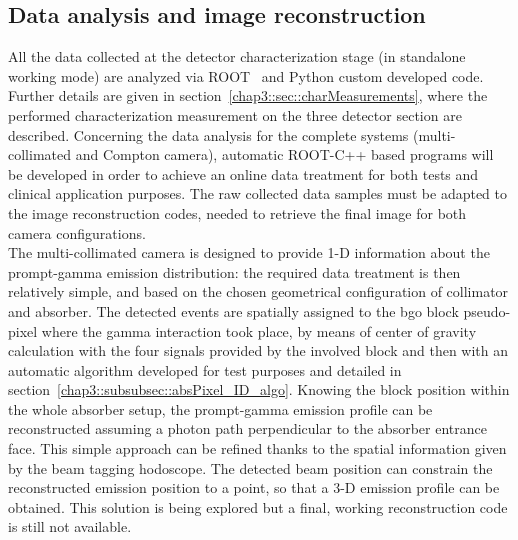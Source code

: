 
\subsection{Data analysis and image reconstruction}\label{chap3::subsec::dataAnalysis}

All the data collected at the detector characterization stage (in standalone working mode) are analyzed via ROOT~\parencite{Brun1997} and Python custom developed code. Further details are given in section~\ref{chap3::sec::charMeasurements}, where the performed characterization measurement on the three detector section are described. Concerning the data analysis for the complete systems (multi-collimated and Compton camera), automatic ROOT-C++ based programs will be developed in order to achieve an online data treatment for both tests and clinical application purposes. The raw collected data samples must be adapted to the image reconstruction codes, needed to retrieve the final image for both camera configurations.\\
The multi-collimated camera is designed to provide 1-D information about the prompt-gamma emission distribution: the required data treatment is then relatively simple, and based on the chosen geometrical configuration of collimator and absorber. The detected events are spatially assigned to the \gls{bgo} block pseudo-pixel where the gamma interaction took place, by means of center of gravity calculation with the four signals provided by the involved block and then with an automatic algorithm developed for test purposes and detailed in section~\ref{chap3::subsubsec::absPixel_ID_algo}. Knowing the block position within the whole absorber setup, the prompt-gamma emission profile can be reconstructed assuming a photon path perpendicular to the absorber entrance face. This simple approach can be refined thanks to the spatial information given by the beam tagging hodoscope. The detected beam position can constrain the reconstructed emission position to a point, so that a 3-D emission profile can be obtained. This solution is being explored but a final, working reconstruction code is still not available.\\
